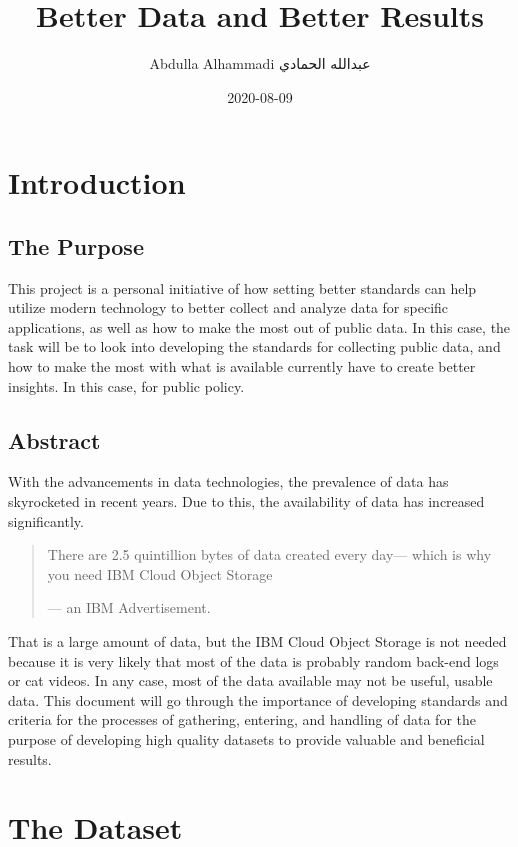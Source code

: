 \documentclass[
]{book}
\title{Better Data and Better Results}
\author{Abdulla Alhammadi \textbar{} عبدالله الحمادي}
\date{2020-08-09}
\begin{document}
\maketitle

{
\setcounter{tocdepth}{1}
\tableofcontents
}
\hypertarget{intro}{%
\chapter{Introduction}\label{intro}}

\hypertarget{the-purpose}{%
\section{The Purpose}\label{the-purpose}}

This project is a personal initiative of how setting better standards can help utilize modern technology to better collect and analyze data for specific applications, as well as how to make the most out of public data. In this case, the task will be to look into developing the standards for collecting public data, and how to make the most with what is available currently have to create better insights. In this case, for public policy.

\hypertarget{abstract}{%
\section{Abstract}\label{abstract}}

With the advancements in data technologies, the prevalence of data has skyrocketed in recent years. Due to this, the availability of data has increased significantly.

\begin{quote}
There are 2.5 quintillion bytes of data created every day---
which is why you need IBM Cloud Object Storage

--- an IBM Advertisement.
\end{quote}

That is a large amount of data, but the IBM Cloud Object Storage is not needed because it is very likely that most of the data is probably random back-end logs or cat videos. In any case, most of the data available may not be useful, usable data. This document will go through the importance of developing standards and criteria for the processes of gathering, entering, and handling of data for the purpose of developing high quality datasets to provide valuable and beneficial results.

\hypertarget{the-dataset}{%
\chapter{The Dataset}\label{the-dataset}}
\end{document}
